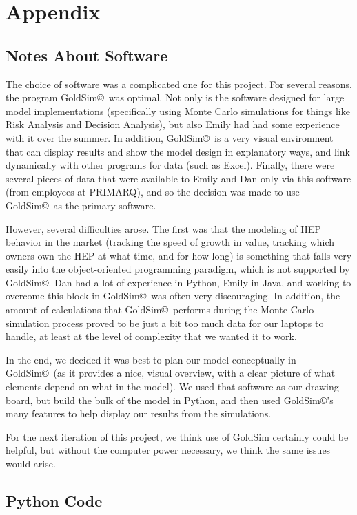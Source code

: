 \documentclass[twoside]{article}
\begin{document}
\section{Appendix}
\subsection{Notes About Software}
The choice of software was a complicated one for this project. For several reasons, the program GoldSim\copyright\ was optimal. Not only is the software designed for large model implementations (specifically using Monte Carlo simulations for things like Risk Analysis and Decision Analysis), but also Emily had had some experience with it over the summer. In addition, GoldSim\copyright\ is a very visual environment that can display results and show the model design in explanatory ways, and link dynamically with other programs for data (such as Excel).  Finally, there were several pieces of data that were available to Emily and Dan only via this software (from employees at PRIMARQ), and so the decision was made to use GoldSim\copyright\ as the primary software.

However, several difficulties arose. The first was that the modeling of HEP behavior in the market (tracking the speed of growth in value, tracking which owners own the HEP at what time, and for how long) is something that falls very easily into the object-oriented programming paradigm, which is not supported by GoldSim\copyright. Dan had a lot of experience in Python, Emily in Java, and working to overcome this block in GoldSim\copyright\ was often very discouraging.  In addition, the amount of calculations that GoldSim\copyright\ performs during the Monte Carlo simulation process proved to be just a bit too much data for our laptops to handle, at least at the level of complexity that we wanted it to work.

In the end, we decided it was best to plan our model conceptually in GoldSim\copyright\ (as it provides a nice, visual overview, with a clear picture of what elements depend on what in the model). We used that software as our drawing board, but build the bulk of the model in Python, and then used GoldSim\copyright 's many features to help display our results from the simulations.

For the next iteration of this project, we think use of GoldSim certainly could be helpful, but without the computer power necessary, we think the same issues would arise.

\subsection{Python Code}
%
\end{document}
